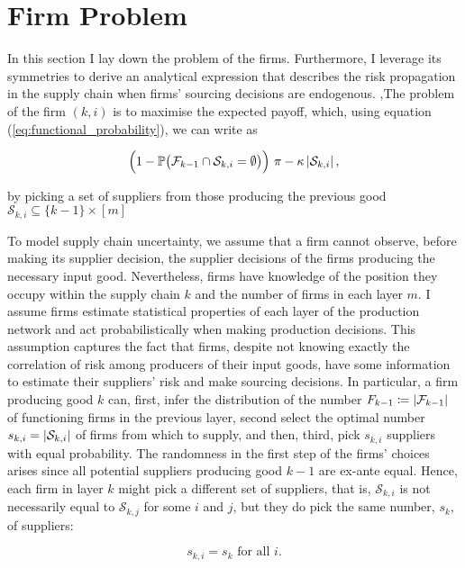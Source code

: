\documentclass[../../main.tex]{subfiles}
\begin{document}
\section{Firm Problem}

In this section I lay down the problem of the firms. Furthermore, I leverage its symmetries to derive an analytical expression that describes the risk propagation in the supply chain when firms' sourcing decisions are endogenous. ,The problem of the firm $(k, i)$ is to maximise the expected payoff, which, using equation (\ref{eq:functional_probability}), we can write as

\begin{equation}
  \Big(1 - \mathbb{P}\big( \mathcal{F}_{k - 1} \cap \mathcal{S}_{k, i} = \emptyset \big) \Big) \ \pi  - \kappa \left\lvert\mathcal{S}_{k, i} \right\rvert,
\end{equation}

by picking a set of suppliers from those producing the previous good $\mathcal{S}_{k, i} \subseteq \{k - 1\} \times [m]$


To model supply chain uncertainty, we assume that a firm cannot observe, before making its supplier decision, the supplier decisions of the firms producing the necessary input good. Nevertheless, firms have knowledge of the position they occupy within the supply chain $k$ and the number of firms in each layer $m$. I assume firms estimate statistical properties of each layer of the production network and act probabilistically when making production decisions. This assumption captures the fact that firms, despite not knowing exactly the correlation of risk among producers of their input goods, have some information to estimate their suppliers' risk and make sourcing decisions. In particular, a firm producing good $k$ can, first, infer the distribution of the number $F_{k - 1} \coloneqq \left\lvert\mathcal{F}_{k - 1}\right\rvert$ of functioning firms in the previous layer, second select the optimal number $s_{k, i} = \left\lvert\mathcal{S}_{k, i}\right\rvert$ of firms from which to supply, and then, third, pick $s_{k, i}$ suppliers with equal probability. The randomness in the first step of the firms' choices arises since all potential suppliers producing good $k - 1$ are ex-ante equal. Hence, each firm in layer $k$ might pick a different set of suppliers, that is, $\mathcal{S}_{k, i}$ is not necessarily equal to $\mathcal{S}_{k, j}$ for some $i$ and $j$, but they do pick the same number, $s_k$, of suppliers:

\begin{equation}
  s_{k, i} = s_k \text{ for all } i.
\end{equation}
\end{document}
